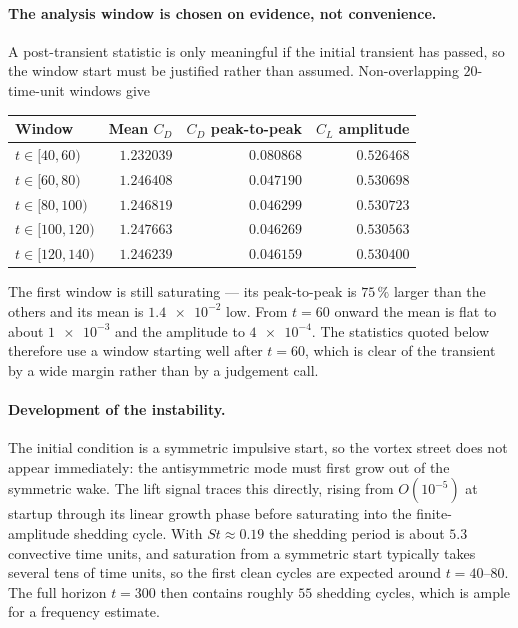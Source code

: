 \paragraph{The analysis window is chosen on evidence, not convenience.} A post-transient
statistic is only meaningful if the initial transient has passed, so the window start must
be justified rather than assumed. Non-overlapping $20$-time-unit windows give
\begin{center}
\begin{tabular}{lrrr}
  \toprule
  Window & Mean $C_D$ & $C_D$ peak-to-peak & $C_L$ amplitude \\
  \midrule
  $t\in[40,60)$ & $1.232039$ & $0.080868$ & $0.526468$ \\
  $t\in[60,80)$ & $1.246408$ & $0.047190$ & $0.530698$ \\
  $t\in[80,100)$ & $1.246819$ & $0.046299$ & $0.530723$ \\
  $t\in[100,120)$ & $1.247663$ & $0.046269$ & $0.530563$ \\
  $t\in[120,140)$ & $1.246239$ & $0.046159$ & $0.530400$ \\
  \bottomrule
\end{tabular}
\end{center}
\noindent The first window is still saturating --- its peak-to-peak is $75\,\%$ larger than
the others and its mean is $\num{1.4e-2}$ low. From $t=60$ onward the mean is flat to about
$\num{1e-3}$ and the amplitude to $\num{4e-4}$. The statistics quoted below therefore use a
window starting well after $t=60$, which is clear of the transient by a wide margin rather
than by a judgement call.

\paragraph{Development of the instability.} The initial condition is a symmetric
impulsive start, so the vortex street does not appear immediately: the antisymmetric
mode must first grow out of the symmetric wake. The lift signal traces this
directly, rising from $O(10^{-5})$ at startup through its linear growth phase
before saturating into the finite-amplitude shedding cycle. With
$St\approx0.19$ the shedding period is about $5.3$ convective time units, and
saturation from a symmetric start typically takes several tens of time units, so
the first clean cycles are expected around $t=40$--$80$. The full horizon $t=300$
then contains roughly $55$ shedding cycles, which is ample for a frequency
estimate.

